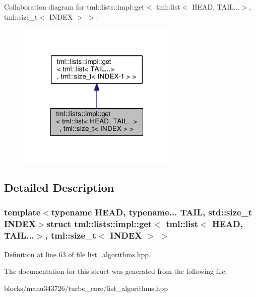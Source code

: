 Collaboration diagram for tml\+:\+:lists\+:\+:impl\+:\+:get$<$ tml\+:\+:list$<$ H\+E\+A\+D, T\+A\+I\+L...$>$, tml\+:\+:size\+\_\+t$<$ I\+N\+D\+E\+X $>$ $>$\+:
\nopagebreak
\begin{figure}[H]
\begin{center}
\leavevmode
\includegraphics[width=216pt]{structtml_1_1lists_1_1impl_1_1get_3_01tml_1_1list_3_01_h_e_a_d_00_01_t_a_i_l_8_8_8_4_00_01tml_1_c4250883e3ebfe85931417319778dbeb}
\end{center}
\end{figure}


\subsection{Detailed Description}
\subsubsection*{template$<$typename H\+E\+A\+D, typename... T\+A\+I\+L, std\+::size\+\_\+t I\+N\+D\+E\+X$>$struct tml\+::lists\+::impl\+::get$<$ tml\+::list$<$ H\+E\+A\+D, T\+A\+I\+L...$>$, tml\+::size\+\_\+t$<$ I\+N\+D\+E\+X $>$ $>$}



Definition at line 63 of file list\+\_\+algorithms.\+hpp.



The documentation for this struct was generated from the following file\+:\begin{DoxyCompactItemize}
\item 
blocks/manu343726/turbo\+\_\+core/list\+\_\+algorithms.\+hpp\end{DoxyCompactItemize}
